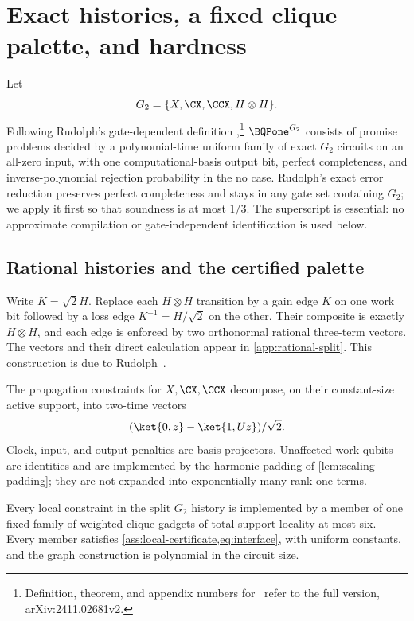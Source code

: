 \section{Exact histories, a fixed clique palette, and hardness}
\label{sec:circuit}

Let
\[
G_2=\{X,\CX,\CCX,H\otimes H\}.
\]
Following Rudolph's gate-dependent definition
\cite[Definition~2.2]{rudolph2026universal},\footnote{Definition, theorem,
and appendix numbers for~\cite{rudolph2026universal} refer to the full
version, arXiv:2411.02681v2.} \(\BQPone^{G_2}\) consists of
promise problems decided by a polynomial-time uniform family of exact
\(G_2\) circuits on an all-zero input, with one computational-basis output
bit, perfect completeness, and inverse-polynomial rejection probability in
the no case.  Rudolph's exact error reduction
\cite[Theorem~2.3]{rudolph2026universal} preserves perfect completeness and
stays in any gate set containing \(G_2\); we apply it first so that soundness
is at most \(1/3\).  The superscript is essential: no approximate compilation
or gate-independent identification is used below.

\subsection{Rational histories and the certified palette}

Write \(K=\sqrt2H\).  Replace each \(H\otimes H\) transition by a gain edge
\(K\) on one work bit followed by a loss edge \(K^{-1}=H/\sqrt2\) on the
other.  Their composite is exactly \(H\otimes H\), and each edge is enforced
by two orthonormal rational three-term vectors.  The vectors and their direct
calculation appear in \cref{app:rational-split}.  This construction is due to
Rudolph~\cite[Appendix~D.1]{rudolph2026universal}.

The propagation constraints for \(X,\CX,\CCX\) decompose, on their
constant-size active support, into two-time vectors
\[
(\ket{0,z}-\ket{1,Uz})/\sqrt2.
\]
Clock, input, and output penalties are basis projectors.  Unaffected work
qubits are identities and are implemented by the harmonic padding of
\cref{lem:scaling-padding}; they are not expanded into exponentially many
rank-one terms.

\begin{lemma}
\label{lem:palette}
Every local constraint in the split \(G_2\) history is implemented by a
member of one fixed family of weighted clique gadgets of total support
locality at most six.  Every member satisfies
\cref{ass:local-certificate,eq:interface}, with uniform constants, and the
graph construction is polynomial in the circuit size.
\end{lemma}


